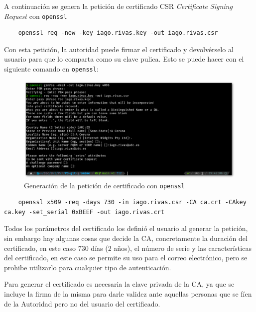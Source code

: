 A continuación se genera la petición de certificado CSR \textit{Certificate Signing Request} con \texttt{openssl}

\begin{verbatim}
    openssl req -new -key iago.rivas.key -out iago.rivas.csr
\end{verbatim}

Con esta petición, la autoridad puede firmar el certificado y devolvérselo al usuario para que lo comparta como su clave pulica. Esto se puede hacer con el siguiente comando en \texttt{openssl}:

\begin{figure}[H]
    \centering
    \includegraphics[width=\textwidth]{openssl-key-sombra.png}
    \caption{Generación de la petición de certificado con \texttt{openssl}}
\end{figure}

\begin{verbatim}
    openssl x509 -req -days 730 -in iago.rivas.csr -CA ca.crt -CAkey ca.key -set_serial 0xBEEF -out iago.rivas.crt
\end{verbatim}

Todos los parámetros del certificado los definió el usuario al generar la petición, sin embargo hay algunas cosas que decide la CA, concretamente la duración del certificado, en este caso 730 días (2 años), el número de serie y las características del certificado, en este caso se permite su uso para el correo electrónico, pero se prohibe utilizarlo para cualquier tipo de autenticación.

Para generar el certificado es necesaria la clave privada de la CA, ya que se incluye la firma de la misma para darle validez ante aquellas personas que se fíen de la Autoridad pero no del usuario del certificado.

